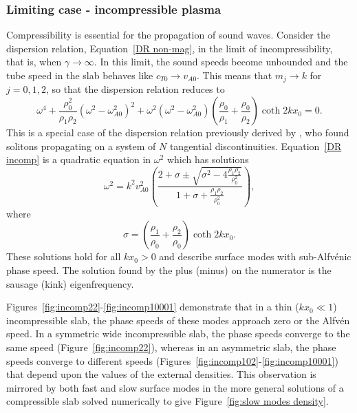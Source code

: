 \documentclass[12pt]{../style-files/ociamthesis}
\begin{document}
\subsubsection{Limiting case - incompressible plasma} \label{sec: incomp}

Compressibility is essential for the propagation of sound waves. Consider the dispersion relation, Equation~\eqref{DR non-mag}, in the limit of incompressibility, that is, when $\gamma \to \infty$. In this limit, the sound speeds become unbounded and the tube speed in the slab behaves like $c_{T0} \to {v_{A0}}$. This means that $m_j \to {k}$ for $j = 0, 1, 2$, so that the dispersion relation reduces to
\begin{equation}
\omega^4 + \frac{\rho_0^2}{\rho_1\rho_2}(\omega^2 - \omega_{A0}^2)^2 + \omega^2(\omega^2 - \omega_{A0}^2)\left(\frac{\rho_0}{\rho_1} + \frac{\rho_0}{\rho_2}\right) \coth{2kx_0} = 0. \label{DR incomp}
\end{equation}
This is a special case of the dispersion relation previously derived by \cite{rud92}, who found solitons propagating on a system of $N$ tangential discontinuities. Equation~\eqref{DR incomp} is a quadratic equation in $\omega^2$ which has solutions
\begin{equation}
\omega^2 = k^2v_{A0}^2\left(\frac{2 + \sigma \pm \sqrt{\sigma^2 - 4\frac{\rho_1\rho_2}{\rho_0^2}}}{1 + \sigma + \frac{\rho_1\rho_2}{\rho_0^2}}\right),
\end{equation}
where
\begin{equation}
\sigma = \left(\frac{\rho_1}{\rho_0} + \frac{\rho_2}{\rho_0}\right)\coth{2kx_0}.
\end{equation}
These solutions hold for all $kx_0 > 0$ and describe surface modes with sub-Alfv\'enic phase speed. The solution found by the plus (minus) on the numerator is the sausage (kink) eigenfrequency.

Figures~\ref{fig:incomp22}-\ref{fig:incomp10001} demonstrate that in a thin ($kx_0 \ll 1$) incompressible slab, the phase speeds of these modes approach zero or the Alfv\'{e}n speed. In a symmetric wide incompressible slab, the phase speeds converge to the same speed (Figure~\ref{fig:incomp22}), whereas in an asymmetric slab, the phase speeds converge to different speeds (Figures~\ref{fig:incomp102}-\ref{fig:incomp10001}) that depend upon the values of the external densities. This observation is mirrored by both fast and slow surface modes in the more general solutions of a compressible slab solved numerically to give Figure~\ref{fig:slow modes density}.
\end{document}
